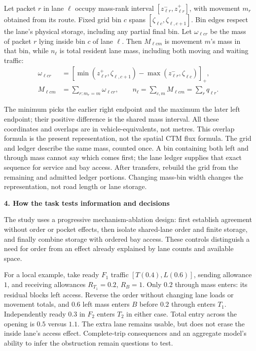 \documentclass[10pt,a4paper]{article}
\newcommand{\head}[1]{\par\vspace{4pt}\noindent\textbf{#1}\par\nobreak\vspace{1pt}}
\begin{document}
\par\begin{samepage}
Let packet $r$ in lane $\ell$ occupy mass-rank interval
$[z^-_{\ell r},z^+_{\ell r}]$, with movement $m_r$ obtained from its
route. Fixed grid bin $c$ spans
$[\zeta_{\ell c},\zeta_{\ell,c+1}]$. Bin edges respect the lane's
physical storage, including any partial final bin. Let $\omega_{\ell cr}$
be the mass of packet $r$ lying inside bin $c$ of lane $\ell$.
Then $M_{\ell cm}$ is movement $m$'s mass in that bin, while $n_\ell$
is total resident lane mass, including both moving and waiting traffic:
\begin{equation}
 \begin{aligned}
 \omega_{\ell cr}&=
 \left[\min(z^+_{\ell r},\zeta_{\ell,c+1})
             -\max(z^-_{\ell r},\zeta_{\ell c})\right]_+,\\
 M_{\ell cm}&=\sum_{r:m_r=m}\omega_{\ell cr},\qquad
 n_\ell=\sum_{c,m}M_{\ell cm}=\sum_r q_{\ell r}.
 \end{aligned}
 \label{eq:compact-grid}
\end{equation}
\par\end{samepage}

The minimum picks the earlier right endpoint and the maximum the later
left endpoint; their positive difference is the shared mass interval.
All these coordinates and overlaps are in vehicle-equivalents, not metres.
This overlap formula is the present representation, not the spatial
CTM flux formula. The grid and ledger describe the same mass, counted
once. A bin containing both left and through mass cannot say which
comes first; the lane ledger supplies that exact sequence for service
and bay access. After transfers, rebuild the grid from the remaining
and admitted ledger portions. Changing mass-bin width changes the representation, not road length
or lane storage.
\par


\head{4. How the task tests information and decisions}
The study uses a progressive mechanism-ablation design: first establish
agreement without order or pocket effects, then isolate shared-lane order
and finite storage, and finally combine storage with ordered bay access.
These controls distinguish a need for order from an effect already
explained by lane counts and available space.

For a local example, take ready $F_1$ traffic $[T(0.4),L(0.6)]$, sending
allowance $1$, and receiving allowances $R_{T_1}=0.2$, $R_B=1$.
Only $0.2$ through mass enters: its residual blocks left access. Reverse
the order without changing lane loads or movement totals, and $0.6$
left mass enters $B$ before $0.2$ through enters $T_1$. Independently
ready $0.3$ in $F_2$ enters $T_2$ in either case. Total entry across the
opening is $0.5$ versus $1.1$. The extra lane remains usable, but does
not erase the inside lane's access effect. Complete-trip consequences
and an aggregate model's ability to infer the obstruction remain questions
to test.
\end{document}
